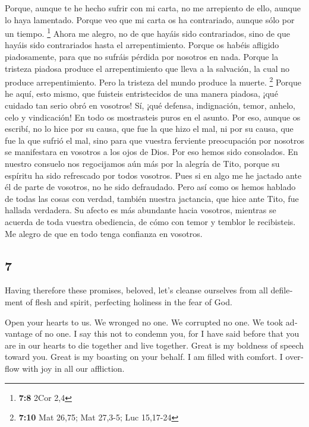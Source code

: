 \begin{paracol}{2}
 Porque, aunque te he hecho sufrir con mi carta, no me
arrepiento de ello, aunque lo haya lamentado. Porque veo que mi carta os
ha contrariado, aunque sólo por un tiempo. \footnote{\textbf{7:8} 2Cor
  2,4}  Ahora me alegro, no de que hayáis sido
contrariados, sino de que hayáis sido contrariados hasta el
arrepentimiento. Porque os habéis afligido piadosamente, para que no
sufráis pérdida por nosotros en nada.  Porque la tristeza
piadosa produce el arrepentimiento que lleva a la salvación, la cual no
produce arrepentimiento. Pero la tristeza del mundo produce la muerte.
\footnote{\textbf{7:10} Mat 26,75; Mat 27,3-5; Luc 15,17-24}
 Porque he aquí, esto mismo, que fuisteis entristecidos
de una manera piadosa, ¡qué cuidado tan serio obró en vosotros! Sí, ¡qué
defensa, indignación, temor, anhelo, celo y vindicación! En todo os
mostrasteis puros en el asunto.  Por eso, aunque os
escribí, no lo hice por su causa, que fue la que hizo el mal, ni por su
causa, que fue la que sufrió el mal, sino para que vuestra ferviente
preocupación por nosotros se manifestara en vosotros a los ojos de Dios.
 Por eso hemos sido consolados. En nuestro consuelo nos
regocijamos aún más por la alegría de Tito, porque su espíritu ha sido
refrescado por todos vosotros.  Pues si en algo me he
jactado ante él de parte de vosotros, no he sido defraudado. Pero así
como os hemos hablado de todas las cosas con verdad, también nuestra
jactancia, que hice ante Tito, fue hallada verdadera.  Su
afecto es más abundante hacia vosotros, mientras se acuerda de toda
vuestra obediencia, de cómo con temor y temblor le recibisteis.
 Me alegro de que en todo tenga confianza en vosotros.

\switchcolumn
\begin{otherlanguage}{english}

\hypertarget{section-13}{%
\section{7}\label{section-13}}

 Having therefore these promises, beloved, let's cleanse
ourselves from all defilement of flesh and spirit, perfecting holiness
in the fear of God.

 Open your hearts to us. We wronged no one. We corrupted
no one. We took advantage of no one.  I say this not to
condemn you, for I have said before that you are in our hearts to die
together and live together.  Great is my boldness of
speech toward you. Great is my boasting on your behalf. I am filled with
comfort. I overflow with joy in all our affliction.


\end{otherlanguage}
\end{paracol}
